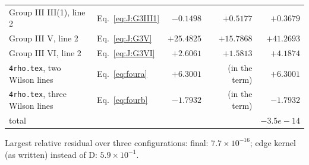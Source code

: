 \documentclass[10pt]{article}
\numberwithin{equation}{section}
\begin{document}
\begin{longtable}{@{}llrrr@{}}
Group III III(1), line 2 & Eq.~\eqref{eq:J:G3III1} & $-0.1498$ & $+0.5177$ & $+0.3679$\\
Group III V, line 2 & Eq.~\eqref{eq:J:G3V} & $+25.4825$ & $+15.7868$ & $+41.2693$\\
Group III VI, line 2 & Eq.~\eqref{eq:J:G3VI} & $+2.6061$ & $+1.5813$ & $+4.1874$\\
\texttt{4rho.tex}, two Wilson lines & Eq.~\eqref{eq:foura} & $+6.3001$ & (in the term) & $+6.3001$\\
\texttt{4rho.tex}, three Wilson lines & Eq.~\eqref{eq:fourb} & $-1.7932$ & (in the term) & $-1.7932$\\
\midrule
total & & & & $-3.5e-14$\\\bottomrule
\end{longtable}
\noindent Largest relative residual over three configurations: final: $7.7\times10^{-16}$; edge kernel (as written) instead of D: $5.9\times10^{-1}$.
\end{document}
